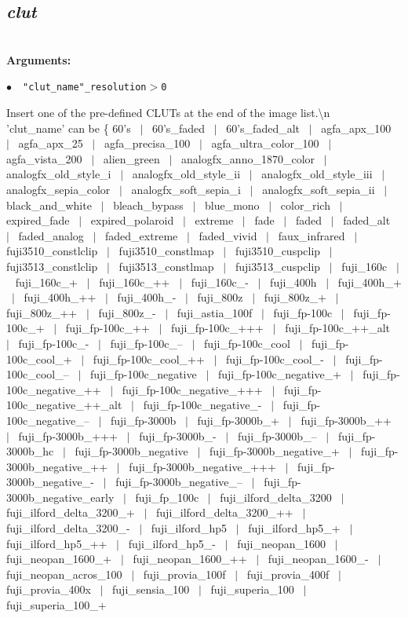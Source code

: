 \documentclass[a4paper,10.5pt,twoside]{book}
\def\comma{\discretionary{,}{}{,}}
\newcommand{\Cb}[1]{\textcolor{cb}{#1}}
\begin{document}
\subsection{\emph{clut} }\vspace*{-0.7em}
~\\\textbf{\Cb{Arguments: }}\begin{flushleft}
{\small \Cb{\hspace*{0.5cm}$\bullet$~~\texttt{"clut\_name"{\comma}\_resolution$>$0}}}\end{flushleft}
Insert one of the pre-defined CLUTs at the end of the image list.\textbackslash n
~\\'clut\_name' can be \{ 60's ~$|$~ 60's\_faded ~$|$~ 60's\_faded\_alt ~$|$~ agfa\_apx\_100 ~$|$~ agfa\_apx\_25 ~$|$~ agfa\_precisa\_100 ~$|$~ agfa\_ultra\_color\_100 ~$|$~ agfa\_vista\_200 ~$|$~ alien\_green ~$|$~ analogfx\_anno\_1870\_color ~$|$~ analogfx\_old\_style\_i ~$|$~ analogfx\_old\_style\_ii ~$|$~ analogfx\_old\_style\_iii ~$|$~ analogfx\_sepia\_color ~$|$~ analogfx\_soft\_sepia\_i ~$|$~ analogfx\_soft\_sepia\_ii ~$|$~ black\_and\_white ~$|$~ bleach\_bypass ~$|$~ blue\_mono ~$|$~ color\_rich ~$|$~ expired\_fade ~$|$~ expired\_polaroid ~$|$~ extreme ~$|$~ fade ~$|$~ faded ~$|$~ faded\_alt ~$|$~ faded\_analog ~$|$~ faded\_extreme ~$|$~ faded\_vivid ~$|$~ faux\_infrared ~$|$~ fuji3510\_constlclip ~$|$~ fuji3510\_constlmap ~$|$~ fuji3510\_cuspclip ~$|$~ fuji3513\_constlclip ~$|$~ fuji3513\_constlmap ~$|$~ fuji3513\_cuspclip ~$|$~ fuji\_160c ~$|$~ fuji\_160c\_+ ~$|$~ fuji\_160c\_++ ~$|$~ fuji\_160c\_- ~$|$~ fuji\_400h ~$|$~ fuji\_400h\_+ ~$|$~ fuji\_400h\_++ ~$|$~ fuji\_400h\_- ~$|$~ fuji\_800z ~$|$~ fuji\_800z\_+ ~$|$~ fuji\_800z\_++ ~$|$~ fuji\_800z\_- ~$|$~ fuji\_astia\_100f ~$|$~ fuji\_fp-100c ~$|$~ fuji\_fp-100c\_+ ~$|$~ fuji\_fp-100c\_++ ~$|$~ fuji\_fp-100c\_+++ ~$|$~ fuji\_fp-100c\_++\_alt ~$|$~ fuji\_fp-100c\_- ~$|$~ fuji\_fp-100c\_-- ~$|$~ fuji\_fp-100c\_cool ~$|$~ fuji\_fp-100c\_cool\_+ ~$|$~ fuji\_fp-100c\_cool\_++ ~$|$~ fuji\_fp-100c\_cool\_- ~$|$~ fuji\_fp-100c\_cool\_-- ~$|$~ fuji\_fp-100c\_negative ~$|$~ fuji\_fp-100c\_negative\_+ ~$|$~ fuji\_fp-100c\_negative\_++ ~$|$~ fuji\_fp-100c\_negative\_+++ ~$|$~ fuji\_fp-100c\_negative\_++\_alt ~$|$~ fuji\_fp-100c\_negative\_- ~$|$~ fuji\_fp-100c\_negative\_-- ~$|$~ fuji\_fp-3000b ~$|$~ fuji\_fp-3000b\_+ ~$|$~ fuji\_fp-3000b\_++ ~$|$~ fuji\_fp-3000b\_+++ ~$|$~ fuji\_fp-3000b\_- ~$|$~ fuji\_fp-3000b\_-- ~$|$~ fuji\_fp-3000b\_hc ~$|$~ fuji\_fp-3000b\_negative ~$|$~ fuji\_fp-3000b\_negative\_+ ~$|$~ fuji\_fp-3000b\_negative\_++ ~$|$~ fuji\_fp-3000b\_negative\_+++ ~$|$~ fuji\_fp-3000b\_negative\_- ~$|$~ fuji\_fp-3000b\_negative\_-- ~$|$~ fuji\_fp-3000b\_negative\_early ~$|$~ fuji\_fp\_100c ~$|$~ fuji\_ilford\_delta\_3200 ~$|$~ fuji\_ilford\_delta\_3200\_+ ~$|$~ fuji\_ilford\_delta\_3200\_++ ~$|$~ fuji\_ilford\_delta\_3200\_- ~$|$~ fuji\_ilford\_hp5 ~$|$~ fuji\_ilford\_hp5\_+ ~$|$~ fuji\_ilford\_hp5\_++ ~$|$~ fuji\_ilford\_hp5\_- ~$|$~ fuji\_neopan\_1600 ~$|$~ fuji\_neopan\_1600\_+ ~$|$~ fuji\_neopan\_1600\_++ ~$|$~ fuji\_neopan\_1600\_- ~$|$~ fuji\_neopan\_acros\_100 ~$|$~ fuji\_provia\_100f ~$|$~ fuji\_provia\_400f ~$|$~ fuji\_provia\_400x ~$|$~ fuji\_sensia\_100 ~$|$~ fuji\_superia\_100 ~$|$~ fuji\_superia\_100\_+ 
\end{document}
